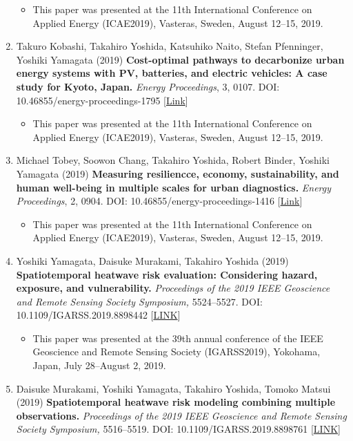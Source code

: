 \documentclass[
]{book}
\providecommand{\tightlist}{%
  \setlength{\itemsep}{0pt}\setlength{\parskip}{0pt}}
\begin{document}
\begin{enumerate}
  \begin{itemize}
  \tightlist
  \item
    This paper was presented at the 11th International Conference on Applied Energy (ICAE2019), Vasteras, Sweden, August 12--15, 2019.
  \end{itemize}
\item
  Takuro Kobashi, Takahiro Yoshida, Katsuhiko Naito, Stefan Pfenninger, Yoshiki Yamagata (2019)
  \textbf{Cost-optimal pathways to decarbonize urban energy systems with PV, batteries, and electric vehicles: A case study for Kyoto, Japan.}
  \emph{Energy Proceedings}, 3, 0107.
  DOI: 10.46855/energy-proceedings-1795 {[}\href{https://doi.org/10.46855/energy-proceedings-1795}{Link}{]}

  \begin{itemize}
  \tightlist
  \item
    This paper was presented at the 11th International Conference on Applied Energy (ICAE2019), Vasteras, Sweden, August 12--15, 2019.
  \end{itemize}
\item
  Michael Tobey, Soowon Chang, Takahiro Yoshida, Robert Binder, Yoshiki Yamagata (2019)
  \textbf{Measuring resiliencce, economy, sustainability, and human well-being in multiple scales for urban diagnostics.}
  \emph{Energy Proceedings}, 2, 0904.
  DOI: 10.46855/energy-proceedings-1416 {[}\href{https://doi.org/10.46855/energy-proceedings-1416}{Link}{]}

  \begin{itemize}
  \tightlist
  \item
    This paper was presented at the 11th International Conference on Applied Energy (ICAE2019), Vasteras, Sweden, August 12--15, 2019.
  \end{itemize}
\item
  Yoshiki Yamagata, Daisuke Murakami, Takahiro Yoshida (2019)
  \textbf{Spatiotemporal heatwave risk evaluation: Considering hazard, exposure, and vulnerability.}
  \emph{Proceedings of the 2019 IEEE Geoscience and Remote Sensing Society Symposium,} 5524--5527.
  DOI: 10.1109/IGARSS.2019.8898442 {[}\href{https://ieeexplore.ieee.org/document/8898442}{LINK}{]}

  \begin{itemize}
  \tightlist
  \item
    This paper was presented at the 39th annual conference of the IEEE Geoscience and Remote Sensing Society (IGARSS2019), Yokohama, Japan, July 28--August 2, 2019.
  \end{itemize}
\item
  Daisuke Murakami, Yoshiki Yamagata, Takahiro Yoshida, Tomoko Matsui (2019)
  \textbf{Spatiotemporal heatwave risk modeling combining multiple observations.}
  \emph{Proceedings of the 2019 IEEE Geoscience and Remote Sensing Society Symposium,} 5516--5519.
  DOI: 10.1109/IGARSS.2019.8898761 {[}\href{https://ieeexplore.ieee.org/document/8898761}{LINK}{]}


\end{enumerate}
\end{document}
